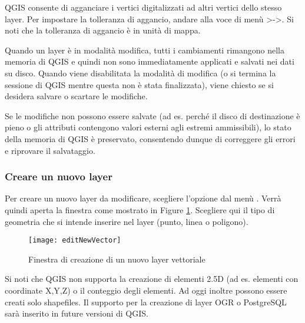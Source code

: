 QGIS consente di agganciare i vertici digitalizzati ad altri vertici dello
stesso layer. Per impostare la tolleranza di aggancio, andare alla voce di
menù >->.
Si noti che la tolleranza di aggancio è in unità di mappa.


Quando un layer è in modalità modifica, tutti i cambiamenti rimangono nella
memoria di QGIS e quindi non sono immediatamente applicati e salvati nei dati
su disco. Quando viene disabilitata la modalità di modifica (o si termina la
sessione di QGIS mentre questa non è stata finalizzata), 
viene chiesto se si desidera salvare o scartare le modifiche.

Se le modifiche non possono essere salvate (ad es. perché il disco di
destinazione è pieno o gli attributi contengono valori esterni agli estremi
ammissibili), lo stato della memoria di QGIS è preservato, consentendo dunque
di correggere gli errori e riprovare il salvataggio.

\subsubsection{Creare un nuovo layer}\label{sec:create shape}

Per creare un nuovo layer da modificare, scegliere l'opzione
 dal menù . 
Verrà quindi aperta la finestra  come mostrato
in Figure \ref{fig:newvectorlayer}. Scegliere qui il tipo di geometria che si
intende inserire nel layer (punto, linea o poligono).

\begin{figure}[ht]
   \begin{center}
   \caption{Finestra di creazione di un nuovo layer vettoriale \nixcaption}\label{fig:newvectorlayer}\smallskip
   \texttt{[image: editNewVector]}
\end{center} 
\end{figure}

Si noti che QGIS non supporta la creazione di elementi 2.5D (ad es. elementi
con coordinate X,Y,Z) o il conteggio degli elementi. Ad oggi inoltre possono
essere creati solo shapefiles. Il supporto per la creazione di layer OGR o
PostgreSQL sarà inserito in future versioni di QGIS. 

